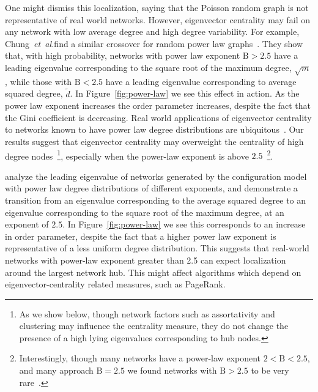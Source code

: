 \documentclass[twocolumn,prl,superscriptaddress]{revtex4}
\newcommand{\etal}{{\it{}et~al.}}
\newcommand\Beta{\mathrm{B}}
\begin{document}
One might dismiss this localization, saying that the Poisson random graph is not representative of real world networks. However, eigenvector centrality may fail on any network with low average degree and high degree variability. For example, Chung~\etal find a similar crossover for random power law graphs~\cite{chung03}. They show that, with high probability, networks with power law exponent $\Beta > 2.5$ have a leading eigenvalue corresponding to the square root of the maximum degree, $\sqrt{m}$, while those with $\Beta < 2.5$ have a leading eigenvalue corresponding to average squared degree, $\tilde{d}$. In Figure~\ref{fig:power-law} we see this effect in action. As the power law exponent increases the order parameter increases, despite the fact that the Gini coefficient is decreasing. %
Real world applications of eigenvector centrality to networks known to have power law degree distributions are ubiquitous~\cite{canright06,page99}. Our results suggest that eigenvector centrality may overweight the centrality of high degree nodes~\footnote{As we show below, though network factors such as assortativity and clustering may influence the centrality measure, they do not change the presence of a high lying eigenvalues corresponding to hub nodes.}, especially when the power-law exponent is above $2.5$~\footnote{Interestingly, though many networks have a power-law exponent $2 < \Beta < 2.5$, and many approach $\Beta = 2.5$ we found networks with $\Beta > 2.5$ to be very rare~\cite{newman03}.}.




analyze the leading eigenvalue of networks generated by the configuration model with power law degree distributions of different exponents, and demonstrate a transition from an eigenvalue corresponding to the average squared degree to an eigenvalue corresponding to the square root of the maximum degree, at an exponent of $2.5$. In Figure~\ref{fig:power-law} we see this corresponds to an increase in order parameter, despite the fact that a higher power law exponent is representative of a less uniform degree distribution. This suggests that real-world networks with power-law exponent greater than 2.5 can expect localization around the largest network hub. This might affect algorithms which depend on eigenvector-centrality related measures, such as PageRank.
\end{document}
